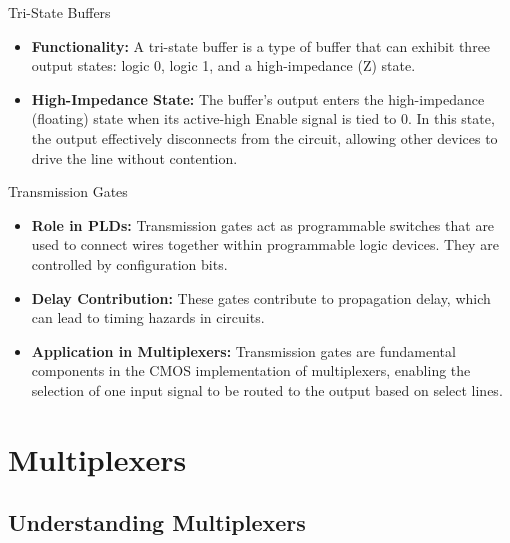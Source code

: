 \documentclass{article}
\begin{document}
\begin{itemize}
Tri-State Buffers

\begin{itemize}
    \item \textbf{Functionality:} A tri-state buffer is a type of buffer that can exhibit three output states: logic 0, logic 1, and a high-impedance (Z) state.
    \item \textbf{High-Impedance State:} The buffer's output enters the high-impedance (floating) state when its active-high Enable signal is tied to 0. In this state, the output effectively disconnects from the circuit, allowing other devices to drive the line without contention.
\end{itemize}

Transmission Gates

\begin{itemize}
    \item \textbf{Role in PLDs:} Transmission gates act as programmable switches that are used to connect wires together within programmable logic devices. They are controlled by configuration bits.
    \item \textbf{Delay Contribution:} These gates contribute to propagation delay, which can lead to timing hazards in circuits.
    \item \textbf{Application in Multiplexers:} Transmission gates are fundamental components in the CMOS implementation of multiplexers, enabling the selection of one input signal to be routed to the output based on select lines.
\end{itemize}

\section{Multiplexers}

\subsection{Understanding Multiplexers}


\end{itemize}
\end{document}
